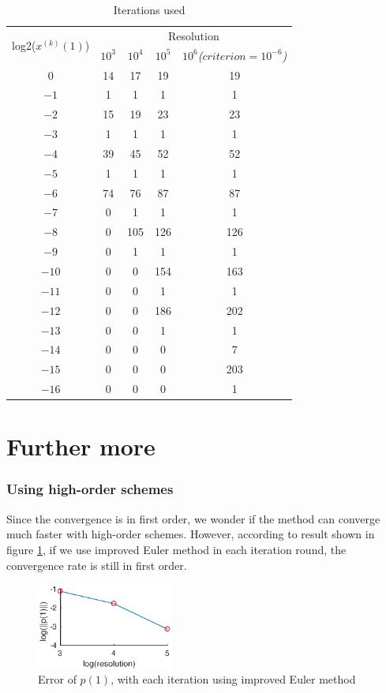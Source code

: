 \documentclass[a4paper]{article}
\begin{document}
\begin{table}[h]
	\centering
	\caption{Iterations used}
	\label{tab:p3-iterations}
	\begin{tabular}{c|cccc}
		\hline
		\multirow{2}{*}{log2($x^{(k)}(1)$)} & \multicolumn{4}{c}{Resolution}\\
		& $10^3$& $10^4$& $10^5$& $10^6$\emph{($criterion=10^{-6}$)}\\
		\hline
		$0$& 14& 17& 19& 19\\
		$-1$& 1& 1& 1& 1\\
		$-2$& 15& 19& 23& 23\\
		$-3$& 1& 1& 1& 1\\
		$-4$& 39& 45& 52& 52\\
		$-5$& 1& 1& 1& 1\\
		$-6$& 74& 76& 87& 87\\
		$-7$& 0& 1& 1& 1\\
		$-8$& 0& 105& 126& 126\\
		$-9$& 0& 1& 1& 1\\
		$-10$& 0& 0& 154& 163\\
		$-11$& 0& 0& 1& 1\\
		$-12$& 0& 0& 186& 202\\
		$-13$& 0& 0& 1& 1\\
		$-14$& 0& 0& 0& 7\\
		$-15$& 0& 0& 0& 203\\
		$-16$& 0& 0& 0& 1\\
		\hline
	\end{tabular}
\end{table}

\part{Further more}
\section{Using high-order schemes}
Since the convergence is in first order, we wonder if the method can converge much faster with high-order schemes.
However, according to result shown in figure \ref{fig:p3-improved-hsolution-error}, if we use improved Euler method in each iteration round, the convergence rate is still in first order.
\begin{figure}[h]
	\centering
	\includegraphics[width=0.4\textwidth]{part3-improved-hsolution-error}
	\caption{Error of $p(1)$, with each iteration using improved Euler method}
	\label{fig:p3-improved-hsolution-error}
\end{figure}
\end{document}
